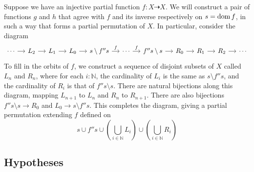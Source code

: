 Suppose we have an injective partial function \( f : X \rightdasharrow X \).
We will construct a pair of functions \( g \) and \( h \) that agree with \( f \) and its inverse respectively on \( s = \operatorname{dom} f \), in such a way that forms a partial permutation of \( X \).
In particular, consider the diagram
\[\begin{tikzcd}[column sep=small]
	\cdots & {L_2} & {L_1} & {L_0} & {s \setminus f''s} & \cdots & {f''s \setminus s} & {R_0} & {R_1} & {R_2} & \cdots
	\arrow[from=1-1, to=1-2]
	\arrow[from=1-2, to=1-3]
	\arrow[from=1-3, to=1-4]
	\arrow[from=1-4, to=1-5]
	\arrow["f", from=1-5, to=1-6]
	\arrow["f", from=1-6, to=1-7]
	\arrow[from=1-7, to=1-8]
	\arrow[from=1-8, to=1-9]
	\arrow[from=1-9, to=1-10]
	\arrow[from=1-10, to=1-11]
\end{tikzcd}\]
To fill in the orbits of \( f \), we construct a sequence of disjoint subsets of \( X \) called \( L_n \) and \( R_n \), where for each \( i : \mathbb N \), the cardinality of \( L_i \) is the same as \( s \setminus f''s \), and the cardinality of \( R_i \) is that of \( f''s \setminus s \).
There are natural bijections along this diagram, mapping \( L_{n + 1} \) to \( L_n \) and \( R_n \) to \( R_{n + 1} \).
There are also bijections \( f '' s \setminus s \to R_0 \) and \( L_0 \to s \setminus f '' s \).
This completes the diagram, giving a partial permutation extending \( f \) defined on
\[ s \cup f '' s \cup \left( \bigcup_{i \in \mathbb N} L_i \right) \cup \left( \bigcup_{i \in \mathbb N} R_i \right) \]

\subsection{Hypotheses}
\label{ss:foa:hypotheses}

